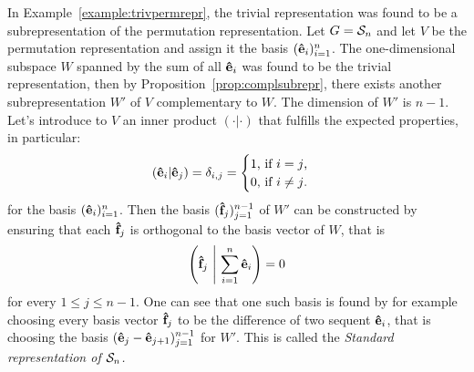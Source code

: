 In Example~\ref{example:trivpermrepr}, the trivial representation was found to be a subrepresentation of the permutation representation. Let $G= \mathcal{S}_n$ and let $V$ be the permutation representation and assign it the basis $(\mathbf{\hat{e}}_i)_{i=1}^n$. The one-dimensional subspace $W$ spanned by the sum of all $\mathbf{\hat{e}}_i$ was found to be the trivial representation, then by Proposition~\ref{prop:complsubrepr}, there exists another subrepresentation $W'$ of $V$ complementary to $W$. The dimension of $W'$ is $n-1$. Let's introduce to $V$ an inner product $(\cdot|\cdot)$ that fulfills the expected properties, in particular:
\begin{align*}
	(\mathbf{\hat{e}}_i|\mathbf{\hat{e}}_j) = \delta_{i,j} = \begin{cases}
		1 \text{, if $i=j$,}\\
		0 \text{, if $i \neq j$.}
	\end{cases}
\end{align*}
for the basis $(\mathbf{\hat{e}}_i)_{i=1}^n$. Then the basis $(\mathbf{\hat{f}}_j)_{j=1}^{n-1}$ of $W'$ can be constructed by ensuring that each $\mathbf{\hat{f}}_j$ is orthogonal to the basis vector of $W$, that is
\begin{align*}
	\left( \mathbf{\hat{f}}_j \ \middle\vert \ \sum_{i=1}^n \mathbf{\hat{e}}_i \right) = 0
\end{align*}
for every $1 \leq j \leq n-1$. One can see that one such basis is found by for example choosing every basis vector $\mathbf{\hat{f}}_j$ to be the difference of two sequent $\mathbf{\hat{e}}_i$, that is choosing the basis $(\mathbf{\hat{e}}_j - \mathbf{\hat{e}}_{j+1})_{j=1}^{n-1}$ for $W'$. This is called the \emph{Standard representation of $\mathcal{S}_n$.}

